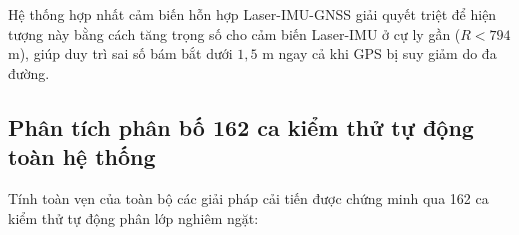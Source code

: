 \begin{table}[H]
\centering
\caption{Đặc tính sai số định vị GPS trong các điều kiện môi trường đô thị khác nhau}
\label{tab:urban-multipath-comparison}
\end{table}

Hệ thống hợp nhất cảm biến hỗn hợp Laser-IMU-GNSS giải quyết triệt để hiện tượng này bằng cách tăng trọng số cho cảm biến Laser-IMU ở cự ly gần ($R < 794$ m), giúp duy trì sai số bám bắt dưới $1{,}5$ m ngay cả khi GPS bị suy giảm do đa đường.

\subsection{Phân tích phân bố 162 ca kiểm thử tự động toàn hệ thống}

\hspace{0.5cm} Tính toàn vẹn của toàn bộ các giải pháp cải tiến được chứng minh qua 162 ca kiểm thử tự động phân lớp nghiêm ngặt:

